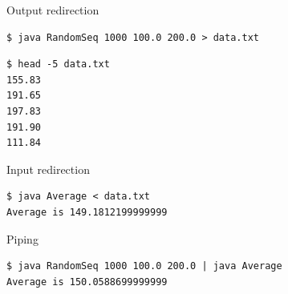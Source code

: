 \documentclass[8pt,a4paper,compress]{beamer}
\begin{document}
\begin{frame}[fragile]
\pause

Output redirection

\smallskip

\begin{lstlisting}[language={},style=focusin]
$ java RandomSeq 1000 100.0 200.0 > data.txt
\end{lstlisting}

\pause\smallskip

\begin{lstlisting}[language={},style=focusin]
$ head -5 data.txt
155.83
191.65
197.83
191.90
111.84
\end{lstlisting}

\pause\bigskip

Input redirection

\smallskip

\begin{lstlisting}[language={},style=focusin]
$ java Average < data.txt
Average is 149.1812199999999
\end{lstlisting}

\pause\bigskip

Piping

\smallskip

\begin{lstlisting}[language={},style=focusin]
$ java RandomSeq 1000 100.0 200.0 | java Average
Average is 150.0588699999999
\end{lstlisting}
\end{frame}
\end{document}
